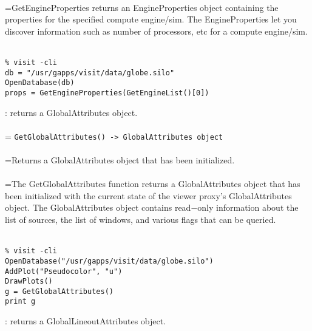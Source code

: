 \documentclass[10pt,a4paper]{report}
\begin{document}
 \\ 
\hangindent=\parindent GetEngineProperties returns an EngineProperties object containing the properties for the specified compute engine/sim. The EngineProperties let you discover information such as number of processors, etc for a compute engine/sim. \\[-3mm] 

\\[-6mm]
\begin{verbatim}% visit -cli
db = "/usr/gapps/visit/data/globe.silo"
OpenDatabase(db)
props = GetEngineProperties(GetEngineList()[0])
\end{verbatim}
\newpage


{}
: returns a GlobalAttributes object.\\[-3mm]

 \\ 
\hangindent=\parindent 
\verb!GetGlobalAttributes() -> GlobalAttributes object!\\ [-3mm]

 \\ 
\hangindent=\parindent Returns a GlobalAttributes object that has been initialized. \\[-3mm] 

 \\ 
\hangindent=\parindent The GetGlobalAttributes function returns a GlobalAttributes object that has been initialized with the current state of the viewer proxy's GlobalAttributes object. The GlobalAttributes object contains read$-$only information about the list of sources, the list of windows, and various flags that can be queried. \\[-3mm] 

\\[-6mm]
\begin{verbatim}% visit -cli
OpenDatabase("/usr/gapps/visit/data/globe.silo")
AddPlot("Pseudocolor", "u")
DrawPlots()
g = GetGlobalAttributes()
print g
\end{verbatim}
\newpage


{}
: returns a GlobalLineoutAttributes object.\\[-3mm]
\end{document}
